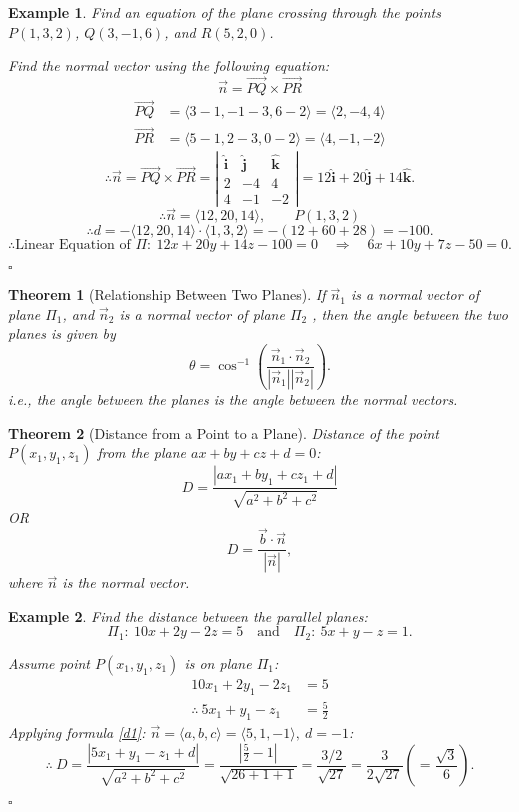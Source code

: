 \documentclass[12pt,a4paper]{article}
\newtheorem{thm}{Theorem}[subsection]
\newtheorem{eg}{Example}[subsection]
\newenvironment*{ans}{\par\indent{\textit{Answer. }}\par}{\par\hfill{$\square$}\par}
\def\vecb{\vec{b}}
\def\vecn{\vec{n}}
\def\veci{\hat{\boldsymbol{\textbf{i}}}}
\def\vecj{\hat{\boldsymbol{\textbf{j}}}}
\def\veck{\hat{\boldsymbol{\textbf{k}}}}
\begin{document}
\begin{eg}
	Find an equation of the plane crossing through the points $P(1,3,2)$, $Q(3,-1,6)$, and $R(5,2,0)$.
	\begin{ans}
		Find the normal vector using the following equation: \[\vecn=\overrightarrow{PQ}\times\overrightarrow{PR}\]
		\[\begin{aligned}
			\overrightarrow{PQ}&=\langle3-1,-1-3,6-2\rangle=\langle2,-4,4\rangle\\
			\overrightarrow{PR}&=\langle5-1,2-3,0-2\rangle=\langle4,-1,-2\rangle
		\end{aligned}\]
		\[\therefore\vecn=\overrightarrow{PQ}\times\overrightarrow{PR}=\left|\begin{matrix}\veci&\vecj&\veck\\2&-4&4\\4&-1&-2\end{matrix}\right|=12\veci+20\vecj+14\veck.\]
		\[\therefore \vecn=\langle12,20,14\rangle,\qquad P(1,3,2)\]
		\[\therefore d=-\langle12,20,14\rangle\cdot\langle1,3,2\rangle=-(12+60+28)=-100.\]
		\[\therefore \text{Linear Equation of } \Pi:\  12x+20y+14z-100=0\quad\Longrightarrow\quad6x+10y+7z-50=0.\]
	\end{ans}
\end{eg}
\begin{thm}[Relationship Between Two Planes]
	If $\vecn_1$ is a normal vector of plane $\Pi_1$, and $\vecn_2$ is a normal vector of plane $\Pi_2$	, then the angle between the two planes is given by \[\theta=\cos^{-1}\left(\frac{\vecn_1\cdot\vecn_2}{|\vecn_1||\vecn_2|}\right).\]
	i.e., the angle between the planes is the angle between the normal vectors. 
\end{thm}
\begin{thm}[Distance from a Point to a Plane]
	Distance of the point $P(x_1,y_1,z_1)$ from the plane $ax+by+cz+d=0$: 
	\begin{equation}\label{d1}
		D=\frac{|ax_1+by_1+cz_1+d|}{\sqrt{a^2+b^2+c^2}} 	
	\end{equation}
	OR
	\begin{equation}\label{d2}
	D=\frac{\vecb\cdot\vecn}{|\vecn|}, 	
	\end{equation}
	where $\vecn$ is the normal vector. 
\end{thm}
\begin{eg}
	Find the distance between the parallel planes: \[\Pi_1:\ 10x+2y-2z=5\quad\text{and}\quad\Pi_2:\ 5x+y-z=1.\]
	\begin{ans}
		Assume point $P(x_1,y_1,z_1)$ is on plane $\Pi_1$: \[\begin{aligned}10x_1+2y_1-2z_1&=5\\\therefore\ 5x_1+y_1-z_1&=\frac{5}{2}\end{aligned}\]	
		Applying formula \ref{d1}: $\vecn=\langle a,b,c\rangle=\langle5,1,-1\rangle,\ d=-1$: 
		\[\therefore\ D=\frac{|5x_1+y_1-z_1+d|}{\sqrt{a^2+b^2+c^2}}=\frac{|\frac{5}{2}-1|}{\sqrt{26+1+1}}=\frac{3/2}{\sqrt{27}}=\frac{3}{2\sqrt{27}}\left(=\frac{\sqrt{3}}{6}\right).\]
	\end{ans}
\end{eg}
\end{document}

